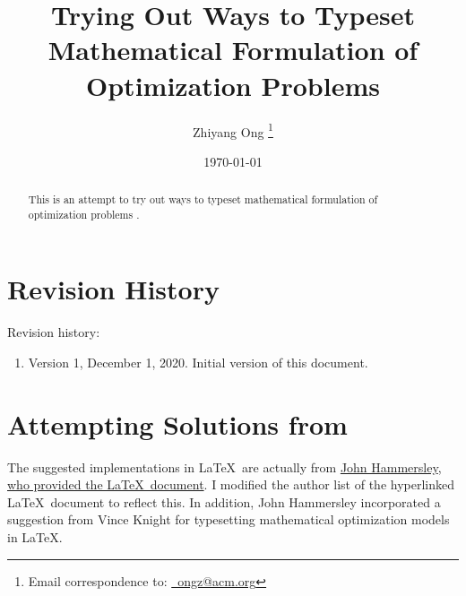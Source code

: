 \documentclass[letter,12pt]{article}
\begin{document}
\title{Trying Out Ways to Typeset Mathematical Formulation of Optimization Problems}
\date{\today}
\author{Zhiyang Ong \thanks{Email correspondence to: \href{mailto:ongz@acm.org}{\Email\ ongz@acm.org}}}
\maketitle


\begin{abstract} 
This is an attempt to try out ways to typeset mathematical formulation of optimization problems \cite{Cay2013}.
\end{abstract}


\tableofcontents
\setcounter{secnumdepth}{4}



\section*{Revision History}
\label{sec:RevisionHistory}


Revision history: \vspace{-0.3cm}
\begin{enumerate} \itemsep -4pt
\item Version 1, December 1, 2020. Initial version of this document.
\end{enumerate}









\section{Attempting Solutions from \cite{Cay2013}}
\label{sec:AttemptingSolutionsFromCay2013}


The suggested implementations in \LaTeX\ are actually from \href{https://github.com/eda-ricercatore/SienaLaTeX/blob/master/notes/examples/from-other-peeps/optimization-templates/main.pdf}{John Hammersley}, \href{https://github.com/eda-ricercatore/SienaLaTeX/blob/master/notes/examples/from-other-peeps/optimization-templates/main.tex}{who provided the \LaTeX\ document}. I modified the author list of the hyperlinked \LaTeX\ document to reflect this. In addition, John Hammersley incorporated a suggestion from Vince Knight for typesetting mathematical optimization models in \LaTeX.
\end{document}
